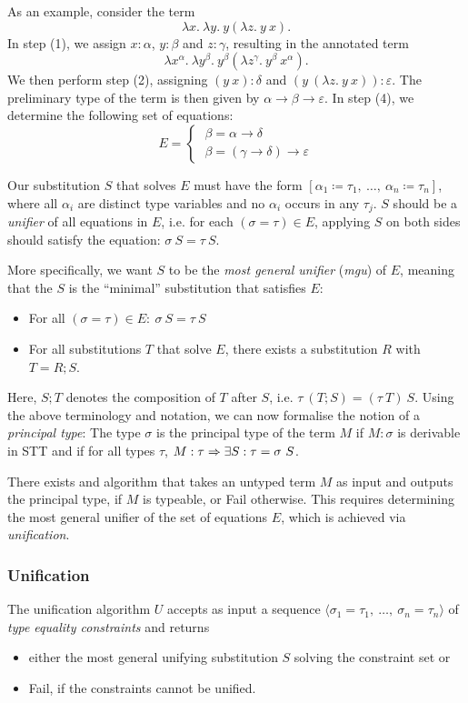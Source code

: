 As an example, consider the term
\[ \lambda x.\ \lambda y.\ y (\lambda z.\ y\ x) .\]
%
In step (1), we assign $x : \alpha$, $y : \beta$ and
$z : \gamma$, resulting in the annotated term
\[ \lambda x^\alpha.\ \lambda y^\beta.\ y^\beta
    (\lambda z^\gamma.\ y^\beta\ x^\alpha) .\]
%
We then perform step (2), assigning $(y\ x) : \delta$ and
$(y\ (\lambda z.\ y\ x)) : \varepsilon$.
The preliminary type of the term is then given by
$\alpha \to \beta \to \varepsilon$.
%
In step (4), we determine the following set of equations:
\[ E = \begin{cases}
    \;\beta = \alpha \to \delta \\
    \;\beta = (\gamma \to \delta) \to \varepsilon
\end{cases} \]

Our substitution $S$ that solves $E$ must have the form
$[\alpha_1 \coloneqq \tau_1,\ \dots,\ \alpha_n \coloneqq \tau_n]$,
where all $\alpha_i$ are distinct type variables and no $\alpha_i$
occurs in any $\tau_j$.
$S$ should be a \emph{unifier} of all equations in $E$, i.e.
for each $(\sigma = \tau) \in E$, applying $S$ on both sides
should satisfy the equation: $\sigma\ S = \tau\ S$.

More specifically, we want $S$ to be the \emph{most general unifier}
(\emph{mgu}) of $E$, meaning that the $S$ is the ``minimal'' substitution
that satisfies $E$:
\begin{itemize}
    \item For all $(\sigma = \tau) \in E:\ \sigma\ S = \tau\ S$
    \item For all substitutions $T$ that solve $E$,
          there exists a substitution $R$ with $T = R; S$.
\end{itemize}
Here, $S;T$ denotes the composition of $T$ after $S$,
i.e. $\tau\ (T; S) = (\tau\ T)\ S$.
Using the above terminology and notation, we can now formalise the notion
of a \emph{principal type}:
%
The type $\sigma$ is the principal type of the term $M$ if
$M : \sigma$ is derivable in STT and if for all types $\tau$,
$M : \tau \RA \exists S : \tau = \sigma\ S$.

There exists and algorithm that takes an untyped term $M$ as input and outputs
the principal type, if $M$ is typeable, or \textsf{Fail} otherwise.
This requires determining the most general unifier of the
set of equations $E$, which is achieved via \emph{unification}.


\subsubsection{Unification}
The unification algorithm $U$ accepts as input a sequence
$\langle \sigma_1 = \tau_1,\ \dots,\ \sigma_n = \tau_n \rangle$
of \emph{type equality constraints}
and returns
\begin{itemize}
    \item either the most general unifying substitution $S$ solving the
          constraint set or
    \item \textsf{Fail}, if the constraints cannot be unified.
\end{itemize}

